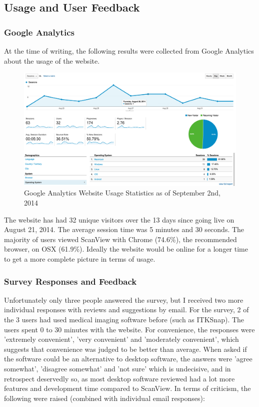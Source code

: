 \documentclass[a4paper,11pt,twoside]{article}
\begin{document}
\subsection{Usage and User Feedback}

\subsubsection{Google Analytics}

At the time of writing, the following results were collected from Google Analytics about the usage of the website.

\begin{figure}[ht!]
\centering
\includegraphics[width=160mm]{graphics/resultsAnalytics_01.png}
\caption{Google Analytics Website Usage Statistics as of September 2nd, 2014}
\label{fig:UIdesign1}
\end{figure}

The website has had 32 unique visitors over the 13 days since going live on August 21, 2014. The average session time was 5 minutes and 30 seconds. The majority of users viewed ScanView with Chrome (74.6\%), the recommended browser, on OSX (61.9\%). Ideally the 
website would be online for a longer time to get a more complete picture in terms of usage. 

\subsubsection{Survey Responses and Feedback}

Unfortunately only three people answered the survey, but I received two more individual responses with reviews and suggestions by email.
For the survey, 2 of the 3 users had used medical imaging software before (such as ITKSnap). The users spent 0 to 30 minutes with the website. For convenience, the responses were 'extremely convenient', 'very convenient' and 'moderately convenient', which suggests that convenience was judged to be better than average. When asked if the software could be an alternative to desktop software, the answers were 'agree somewhat', 'disagree somewhat' and 'not sure' which is undecisive, and in retrospect deservedly so, as most desktop software reviewed had a lot more features and development time compared to ScanView. In terms of criticism, the following were raised (combined with individual email responses):
\end{document}
